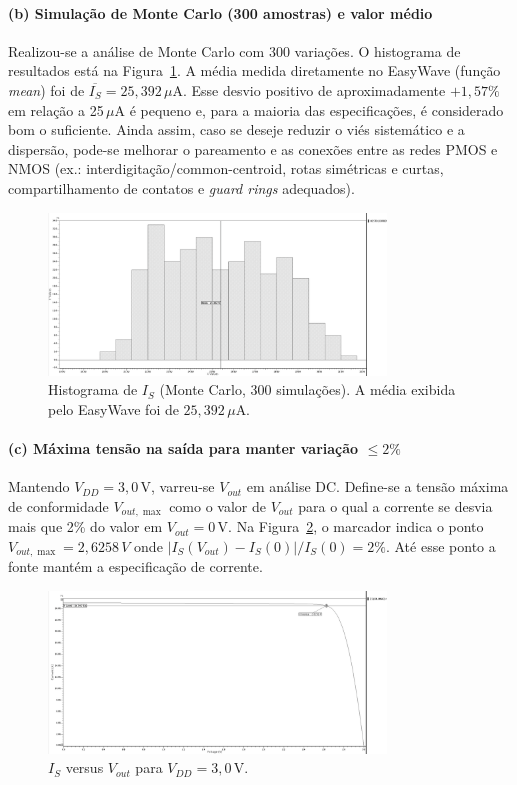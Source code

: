 \documentclass[12pt,a4paper]{article}
\begin{document}
\paragraph{(b) Simulação de Monte Carlo (300 amostras) e valor médio}
Realizou-se a análise de Monte Carlo com 300 variações. O histograma de resultados está na Figura~\ref{fig:q16b}. A média medida diretamente no EasyWave (função \emph{mean}) foi de $\overline{I_S}=25{,}392\,\mu$A. Esse desvio positivo de aproximadamente $+1{,}57\%$ em relação a 25\,$\mu$A é pequeno e, para a maioria das especificações, é considerado bom o suficiente. Ainda assim, caso se deseje reduzir o viés sistemático e a dispersão, pode-se melhorar o pareamento e as conexões entre as redes PMOS e NMOS (ex.: interdigitação/common-centroid, rotas simétricas e curtas, compartilhamento de contatos e \textit{guard rings} adequados).

\begin{figure}[H]
    \centering
    \includegraphics[width=0.8\textwidth]{images/16.2.png}
    \caption{Histograma de $I_S$ (Monte Carlo, 300 simulações). A média exibida pelo EasyWave foi de $25{,}392\,\mu$A.}
    \label{fig:q16b}
\end{figure}

\paragraph{(c) Máxima tensão na saída para manter variação $\leq 2\%$}
Mantendo $V_{DD}=3{,}0$\,V, varreu-se $V_{out}$ em análise DC. Define-se a tensão máxima de conformidade $V_{out,\max}$ como o valor de $V_{out}$ para o qual a corrente se desvia mais que 2\% do valor em $V_{out}=0$\,V. Na Figura~\ref{fig:q16c}, o marcador indica o ponto $V_{out,\max} = 2,6258\,V$ onde $\left|I_S(V_{out})-I_S(0)\right|/I_S(0)=2\%$. Até esse ponto a fonte mantém a especificação de corrente.

\begin{figure}[H]
    \centering
    \includegraphics[width=0.8\textwidth]{images/16.3.png}
    \caption{$I_S$ versus $V_{out}$ para $V_{DD}=3{,}0$\,V.}
    \label{fig:q16c}
\end{figure}
\end{document}
